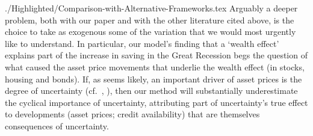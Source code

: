 \documentclass[titlepage]{\econtex}
\begin{document}
\begin{verbatimwrite}{./Highlighted/Comparison-with-Alternative-Frameworks.tex}
Arguably a deeper problem, both with our paper and with the other literature cited above, is the choice to take as exogenous some of the variation that we would most urgently like to understand.  In particular, our model's finding that a `wealth effect' explains part of the increase in saving in the Great Recession begs the question of what caused the asset price movements that underlie the wealth effect (in stocks, housing and bonds). If, as seems likely, an important driver of asset prices is the degree of uncertainty (cf.\ \cite{bexUncertaintyAssetPrices}, \cite{drechslerUncertainty}), then our method will substantially underestimate the cyclical importance of uncertainty, attributing part of uncertainty's true effect to developments (asset prices; credit availability) that are themselves consequences of uncertainty.


\end{verbatimwrite}
\end{document}
